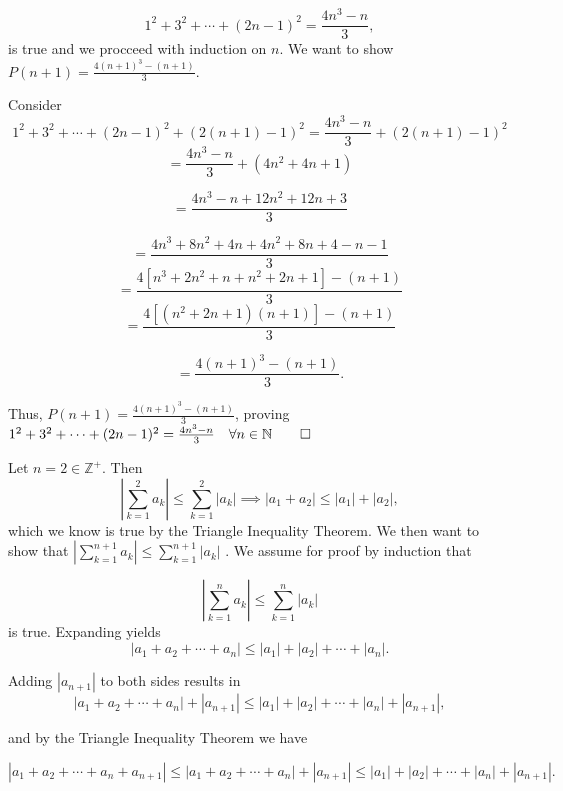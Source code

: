 \documentclass{report}
\begin{document}
$$ 1^{2}+3^{2}+\cdots+(2 n-1)^{2}=\frac{4 n^{3}-n}{3}, $$
is true and we procceed with induction on $n$. We want to show $P(n+1) = \frac{4 (n+1)^{3}-(n+1)}{3}$.

Consider
$$ 
1^{2}+3^{2}+\cdots+(2 n-1)^{2} +(2 (n+1)-1)^{2}=\frac{4 n^{3}-n}{3} + (2 (n+1)-1)^{2} 
$$  
$$ 
=\frac{4 n^{3}-n}{3} + (4n^2+4n +1) 
$$  

$$ 
=\frac{4 n^{3}-n+12n^2+12n +3}{3}
$$  

$$ 
=\frac{4 n^{3} + 8n^2 + 4n + 4n^2 + 8n + 4 -n -1}{3}
$$  
$$ 
=\frac{4 [n^{3} + 2n^2 + n + n^2 + 2n + 1] -(n +1)}{3}
$$  
$$ 
=\frac{4 [(n^{2} + 2n + 1)(n+1)] -(n+1)}{3}
$$  

$$ 
=\frac{4 (n+1)^3 -(n+1)}{3}.
$$  

Thus, $P(n+1) = \frac{4 (n+1)^{3}-(n+1)}{3}$, proving $1^{2}+3^{2}+\cdots+(2 n-1)^{2}=\frac{4 n^{3}-n}{3} \quad \forall n \in \mathbb{N} \qed$  

\bigskip
{}

\sol
Let $n=2 \in \mathbb{Z}^{+}$. Then 
$$
\left|\sum_{k=1}^{2} a_{k}\right| \leq \sum_{k=1}^{2}\left|a_{k}\right| \implies
\left|a_1 + a_2\right| \leq \left| a_1\right| + \left| a_2\right|,$$ which we know is true by the Triangle Inequality Theorem. We then want to show that $\left|\sum_{k=1}^{n+1} a_{k}\right| \leq \sum_{k=1}^{n+1}\left|a_{k}\right|$
.
We assume for proof by induction that

$$
\left|\sum_{k=1}^{n} a_{k}\right| \leq \sum_{k=1}^{n}\left|a_{k}\right|$$ is true.
Expanding yields
$$                                                                       
\left|a_1 + a_2 + \cdots + a_n\right| \leq \left|a_{1}\right| + \left|a_{2}\right|
+ \cdots +  \left|a_{n}\right|.$$

Adding $\left|a_{n+1}\right|$ to both sides results in
$$
\left|a_1 + a_2 + \cdots + a_n\right| + \left|a_{n+1}\right|  \leq \left|a_{1}\right| + \left|a_{2}\right|
+ \cdots +  \left|a_{n}\right|  + \left|a_{n+1}\right|,$$

and by the Triangle Inequality Theorem we have

$$
\left|a_1 + a_2 + \cdots + a_n + a_{n+1}\right|  \leq
\left|a_1 + a_2 + \cdots + a_n\right| + \left|a_{n+1}\right|  \leq \left|a_{1}\right| + \left|a_{2}\right|
+ \cdots +  \left|a_{n}\right|  + \left|a_{n+1}\right|.$$
\end{document}
